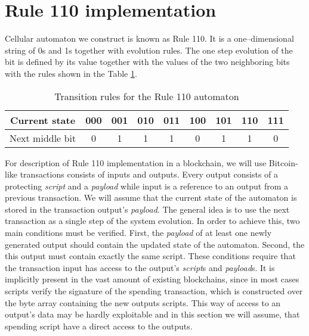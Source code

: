 \documentclass[runningheads]{llncs}
\newcommand{\payload}{\textit{payload}}
\newcommand{\script}{\textit{script}}
\begin{document}
    \section{Rule 110 implementation}
    Cellular automaton we construct is known as Rule 110.
    It is a one--dimensional string of 0s and 1s together with evolution rules.
    The one step evolution of the bit is defined by its value together with the
    values of the two neighboring bits with the rules shown in the Table
    \ref{tab:transitions}.
    \begin{table}
        \caption{Transition rules for the Rule 110 automaton}
        \label{tab:transitions}
        \centering
        \begin{tabular} {| *{9}{c|} }
            \hline
            Current state & 000 & 001 & 010 & 011 & 100 & 101 & 110 & 111 \\ \hline
            Next middle bit & 0 & 1 & 1 & 1 & 0 & 1 & 1 & 0 \\
            \hline
        \end{tabular}
    \end{table}

    For description of Rule 110 implementation in a blockchain, we will use Bitcoin-like
    transactions consists of inputs and outputs. Every output consists of a protecting \script{}
    and a \payload{} while input is a reference to an output from a previous transaction.
    We will assume that the current state of the automaton is stored in the transaction output's \payload{}.
    The general idea is to use the next transaction as a single
    step of the system evolution. In order to achieve this, two main conditions must
    be verified. First, the \payload{} of at least one newly generated output should contain
    the updated state of the automaton. Second, the this output must contain
    exactly the same script. These conditions require that the transaction input has
    access to the output's \script{}s and \payload{}s. It is implicitly present in the
    vast amount of existing blockchains, since in most cases scripts verify the
    signature of the spending transaction, which is constructed over the byte array
    containing the new outputs scripts. This way of access to an output's data may be
    hardly exploitable and in this section we will assume, that spending script have a
    direct access to the outputs.
\end{document}

